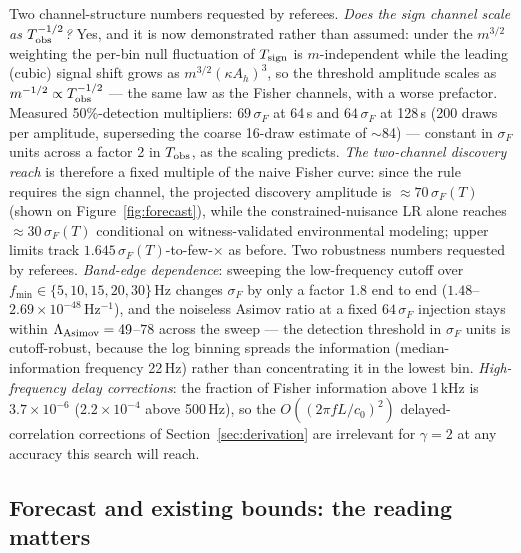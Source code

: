 \documentclass[11pt]{article}
\newcommand{\Ah}{A_h}
\begin{document}
Two channel-structure numbers requested by referees. \emph{Does the sign channel scale as $T_{\rm obs}^{-1/2}$?} Yes, and it is now demonstrated rather than assumed: under the $m^{3/2}$ weighting the per-bin null fluctuation of $T_{\rm sign}$ is $m$-independent while the leading (cubic) signal shift grows as $m^{3/2}(\kappa\Ah)^3$, so the threshold amplitude scales as $m^{-1/2} \propto T_{\rm obs}^{-1/2}$ --- the same law as the Fisher channels, with a worse prefactor. Measured 50\%-detection multipliers: $69\,\sigma_F$ at 64\,s and $64\,\sigma_F$ at 128\,s (200 draws per amplitude, superseding the coarse 16-draw estimate of $\sim$84) --- constant in $\sigma_F$ units across a factor 2 in $T_{\rm obs}$, as the scaling predicts. \emph{The two-channel discovery reach} is therefore a fixed multiple of the naive Fisher curve: since the rule requires the sign channel, the projected discovery amplitude is $\approx 70\,\sigma_F(T)$ (shown on Figure~\ref{fig:forecast}), while the constrained-nuisance LR alone reaches $\approx 30\,\sigma_F(T)$ conditional on witness-validated environmental modeling; upper limits track $1.645\,\sigma_F(T)$-to-few-$\times$ as before. Two robustness numbers requested by referees. \emph{Band-edge dependence}: sweeping the low-frequency cutoff over $f_{\min} \in \{5, 10, 15, 20, 30\}$\,Hz changes $\sigma_F$ by only a factor 1.8 end to end ($1.48$--$2.69\times10^{-48}\,\mathrm{Hz^{-1}}$), and the noiseless Asimov ratio at a fixed $64\,\sigma_F$ injection stays within $\Lambda_{\rm Asimov} = 49$--$78$ across the sweep --- the detection threshold in $\sigma_F$ units is cutoff-robust, because the log binning spreads the information (median-information frequency 22\,Hz) rather than concentrating it in the lowest bin. \emph{High-frequency delay corrections}: the fraction of Fisher information above 1\,kHz is $3.7\times10^{-6}$ ($2.2\times10^{-4}$ above 500\,Hz), so the $O((2\pi f L/c_0)^2)$ delayed-correlation corrections of Section~\ref{sec:derivation} are irrelevant for $\gamma = 2$ at any accuracy this search will reach.

\subsection{Forecast and existing bounds: the reading matters}
\label{sec:bounds}
\end{document}
